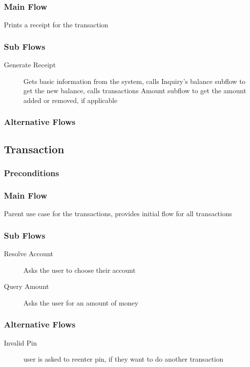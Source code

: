 \documentclass[10pt,letterpaper,notitlepage]{article}
\begin{document}
\subsubsection{Main Flow}
Prints a receipt for the transaction
\subsubsection{Sub Flows}
\begin{description}

\item[Generate Receipt] Gets basic information from the system, calls Inquiry's balance subflow to get the new balance, calls transactions Amount subflow to get the amount added or removed, if applicable
\end{description}
\subsubsection{Alternative Flows}

\subsection{Transaction}
\subsubsection{Preconditions}
\subsubsection{Main Flow}
Parent use case for the transactions, provides initial flow for all transactions
\subsubsection{Sub Flows}
\begin{description}
\item[Resolve Account] Asks the user to choose their account
\item[Query Amount] Asks the user for an amount of money
\end{description}
\subsubsection{Alternative Flows}
\begin{description}
\item[Invalid Pin] user is asked to reenter pin, if they want to do another transaction
\end{description}
\end{document}
